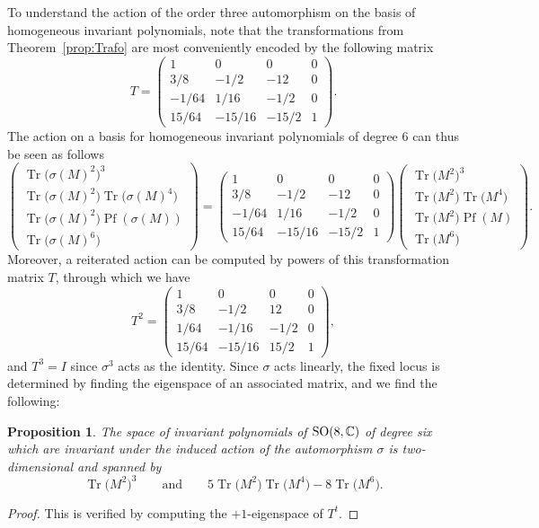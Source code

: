 \documentclass[10pt,a4paper]{amsart}
\numberwithin{equation}{section}
\newcommand{\Pf}{\operatorname{Pf}}
\newcommand{\Tr}{\operatorname{Tr}}
\newtheorem{Proposition}[Theorem]{Proposition}
 { \theoremstyle{definition}
\newtheorem{Definition}[Theorem]{Definition}
\newtheorem{Remark}[Theorem]{Remark} }
\begin{document}
To understand the action of the order three automorphism on the basis of homogeneous invariant polynomials, note that the transformations from Theorem~\ref{prop:Trafo} are most conveniently encoded by the following matrix
 \begin{equation*}%
 T=\begin{pmatrix}
1 & 0 & 0 & 0 \\
3/8 & -1/2 & -12 & 0 \\
-1/64 & 1/16 & -1/2 & 0 \\
15/64 & -15/16 & -15/2 & 1
\end{pmatrix}.
\end{equation*}
The action on a basis for homogeneous invariant polynomials of degree 6 can thus be seen as follows
\begin{equation*}
 \begin{pmatrix}
\Tr \big(\sigma(M)^2\big)^3\\ \Tr\big(\sigma(M)^2\big)\Tr\big(\sigma(M)^4\big) \\ \Tr\big(\sigma(M)^2\big) \Pf(\sigma(M)) \\ \Tr\big(\sigma(M)^6\big)
\end{pmatrix} =
\begin{pmatrix}
1 & 0 & 0 & 0 \\
3/8 & -1/2 & -12 & 0 \\
-1/64 & 1/16 & -1/2 & 0 \\
15/64 & -15/16 & -15/2 & 1
\end{pmatrix}
\begin{pmatrix}
\Tr \big(M^2\big)^3\\ \Tr\big(M^2\big)\Tr\big(M^4\big) \\ \Tr\big(M^2\big) \Pf(M) \\ \Tr\big(M^6\big)
\end{pmatrix}.
\end{equation*}
 Moreover, a reiterated action can be computed by powers of this transformation matrix $T$, through which we have
 \begin{equation*}
 T^2 = \begin{pmatrix}
1 & 0 & 0 & 0 \\
3/8 & -1/2 & 12 & 0 \\
1/64 & -1/16 & -1/2 & 0 \\
15/64 & -15/16 & 15/2 & 1
\end{pmatrix},
\end{equation*}
and $T^3 = I$ since $\sigma^3$ acts as the identity.
 Since $\sigma$ acts linearly, the fixed locus is determined by finding the eigenspace of an associated matrix, and we find the following:
 \begin{Proposition}\label{deg6}
 The space of invariant polynomials of ${\rm SO}(8,\mathbb{C})$ of degree six which are invariant under the induced action of the automorphism $\sigma$ is two-dimensional and spanned by \[\Tr\big(M^2\big)^3 \qquad \text{and}\qquad 5 \Tr\big(M^2\big) \Tr\big(M^4\big) - 8 \Tr \big(M^6\big).\]
 \end{Proposition}
 \begin{proof}
 This is verified by computing the $+1$-eigenspace of $T^t$.
 \end{proof}
\end{document}
